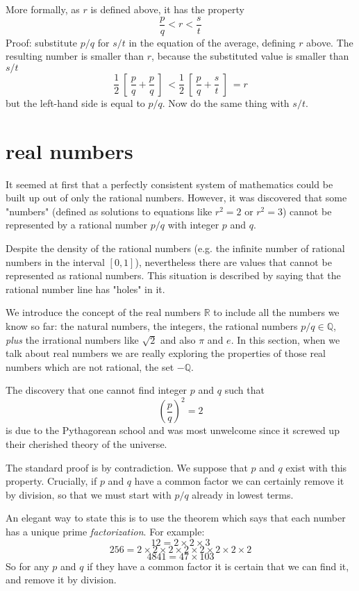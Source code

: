 \documentclass[11pt, oneside]{article}   	%
\begin{document}
More formally, as $r$ is defined above, it has the property
\[ \frac{p}{q} < r < \frac{s}{t} \]
Proof:  substitute $p/q$ for $s/t$ in the equation of the average, defining $r$ above.  The resulting number is smaller than $r$, because the substituted value is smaller than $s/t$
\[ \frac{1}{2} \ [ \  \frac{p}{q} + \frac{p}{q} \ ] \ < \frac{1}{2} \ [ \  \frac{p}{q} + \frac{s}{t} \ ] \  = r \]
but the left-hand side is equal to $p/q$.  Now do the same thing with $s/t$.

\section*{real numbers}
It seemed at first that a perfectly consistent system of mathematics could be built up out of only the rational numbers.  However, it was discovered that some "numbers" (defined as solutions to equations like $r^2 = 2$ or $r^2 = 3$) cannot be represented by a rational number $p/q$ with integer $p$ and $q$.  

Despite the density of the rational numbers (e.g. the infinite number of rational numbers in the interval $[0,1]$), nevertheless there are values that cannot be represented as rational numbers.  This situation is described by saying that the rational number line has "holes" in it.

We introduce the concept of the real numbers $\mathbb{R}$ to include all the numbers we know so far: the natural numbers, the integers, the rational numbers $p/q \in \mathbb{Q}$, \emph{plus} the irrational numbers like $\sqrt{2}$ and also $\pi$ and $e$.  In this section, when we talk about real numbers we are really exploring the properties of those real numbers which are not rational, the set $- \mathbb{Q}$. 

The discovery that one cannot find integer $p$ and $q$ such that
\[ (\frac{p}{q})^2 = 2 \]
is due to the Pythagorean school and was most unwelcome since it screwed up their cherished theory of the universe.

The standard proof is by contradiction.  We suppose that $p$ and $q$ exist with this property.  Crucially, if $p$ and $q$ have a common factor we can certainly remove it by division, so that we must start with $p/q$ already in lowest terms.

An elegant way to state this is to use the theorem which says that each number has a unique prime \emph{factorization}.  For example:
\[ 12 = 2 \times 2 \times 3 \]
\[ 256 = 2 \times 2 \times 2 \times 2 \times 2 \times 2 \times 2 \times 2 \]
\[ 4841 = 47 \times 103 \]
So for any $p$ and $q$ if they have a common factor it is certain that we can find it, and remove it by division.
\end{document}
